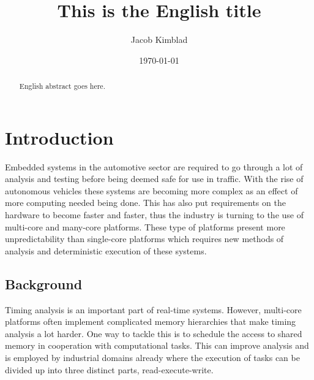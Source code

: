 \documentclass{kththesis}
\title{This is the English title}
\author{Jacob Kimblad}
\date{\today}
\begin{document}
\frontmatter

\titlepage

\begin{abstract} 

    English abstract goes here.

\end{abstract}


\begin{otherlanguage}{swedish} 
    
    \begin{abstract}

    \end{abstract} 

\end{otherlanguage}


\printnomenclature


\tableofcontents


\mainmatter


\chapter{Introduction} 

Embedded systems in the automotive sector are required to go through a lot of analysis and testing
before being deemed safe for use in traffic. With the rise of autonomous vehicles these systems are
becoming more complex as an effect of more computing needed being done.  This has also put
requirements on the hardware to become faster and faster, thus the industry is turning to the use of
multi-core and many-core platforms. These type of platforms present more unpredictability than
single-core platforms which requires new methods of analysis and deterministic execution of these
systems. 


\section{Background} 

Timing analysis is an important part of real-time systems. However, multi-core platforms often
implement complicated memory hierarchies that make timing analysis a lot harder. One way to tackle
this is to schedule the access to shared memory in cooperation with computational tasks. This can
improve analysis and is employed by industrial domains already where the execution of tasks can be
divided up into three distinct parts, read-execute-write.
\end{document}
